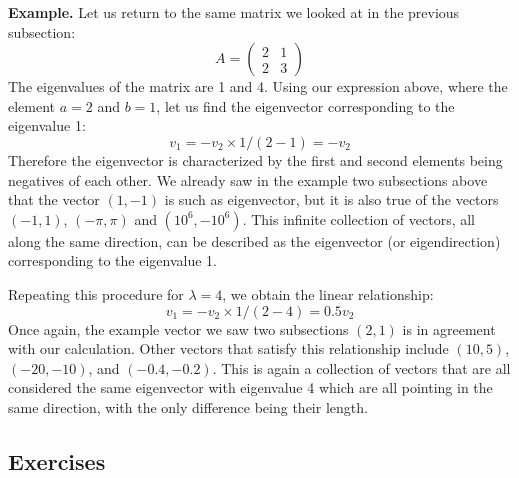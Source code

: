 \documentclass[
  letterpaper,
  DIV=11,
  numbers=noendperiod]{scrreprt}
\begin{document}
\textbf{Example.} Let us return to the same matrix we looked at in the
previous subsection: \[ 
A = \left(\begin{array}{cc}2 & 1 \\ 2& 3\end{array}\right)
\] The eigenvalues of the matrix are 1 and 4. Using our expression
above, where the element \(a=2\) and \(b=1\), let us find the
eigenvector corresponding to the eigenvalue 1: \[ 
v_1 = - v_2 \times  1/(2-1) = - v_2
\] Therefore the eigenvector is characterized by the first and second
elements being negatives of each other. We already saw in the example
two subsections above that the vector \((1,-1)\) is such as eigenvector,
but it is also true of the vectors \((-1,1)\), \((-\pi, \pi)\) and
\((10^6, -10^6)\). This infinite collection of vectors, all along the
same direction, can be described as the eigenvector (or eigendirection)
corresponding to the eigenvalue 1.

Repeating this procedure for \(\lambda = 4\), we obtain the linear
relationship: \[ v_1 = - v_2 \times  1/(2-4) = 0.5 v_2\] Once again, the
example vector we saw two subsections \((2,1)\) is in agreement with our
calculation. Other vectors that satisfy this relationship include
\((10,5)\), \((-20,-10)\), and \((-0.4,-0.2)\). This is again a
collection of vectors that are all considered the same eigenvector with
eigenvalue 4 which are all pointing in the same direction, with the only
difference being their length.

\hypertarget{exercises-38}{%
\subsection{Exercises}\label{exercises-38}}
\end{document}
